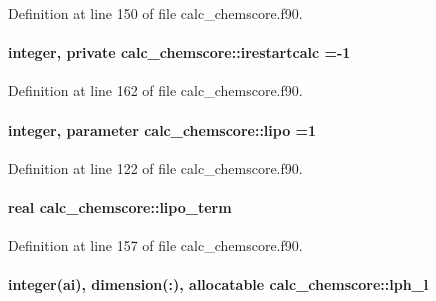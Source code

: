 Definition at line 150 of file calc\-\_\-chemscore.\-f90.

\hypertarget{classcalc__chemscore_ae221adc2a0ae83b528c10fe7b2493c80}{
\paragraph[{irestartcalc}]{\setlength{\rightskip}{0pt plus 5cm}integer, private calc\-\_\-chemscore\-::irestartcalc =-\/1\hspace{0.3cm}{\ttfamily [private]}}}\label{classcalc__chemscore_ae221adc2a0ae83b528c10fe7b2493c80}


Definition at line 162 of file calc\-\_\-chemscore.\-f90.

\hypertarget{classcalc__chemscore_aff9edea104beefd190c34dc9fd12a9b3}{
\paragraph[{lipo}]{\setlength{\rightskip}{0pt plus 5cm}integer, parameter calc\-\_\-chemscore\-::lipo =1}}\label{classcalc__chemscore_aff9edea104beefd190c34dc9fd12a9b3}


Definition at line 122 of file calc\-\_\-chemscore.\-f90.

\hypertarget{classcalc__chemscore_a3ba58639189e7f54e3a4d95eff409d27}{
\paragraph[{lipo\-\_\-term}]{\setlength{\rightskip}{0pt plus 5cm}real calc\-\_\-chemscore\-::lipo\-\_\-term}}\label{classcalc__chemscore_a3ba58639189e7f54e3a4d95eff409d27}


Definition at line 157 of file calc\-\_\-chemscore.\-f90.

\hypertarget{classcalc__chemscore_a39c1639390221a6c4a2a8edba8cb98cc}{
\paragraph[{lph\-\_\-l}]{\setlength{\rightskip}{0pt plus 5cm}integer(ai), dimension(\-:), allocatable calc\-\_\-chemscore\-::lph\-\_\-l}}\label{classcalc__chemscore_a39c1639390221a6c4a2a8edba8cb98cc}


